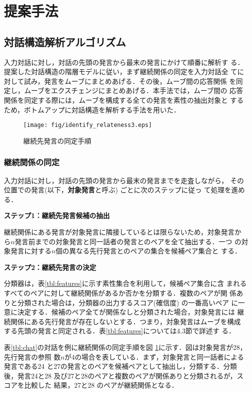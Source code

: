 \section{提案手法}

\subsection{対話構造解析アルゴリズム}
入力対話に対し，対話の先頭の発言から最末の発言にかけて順番に解析す
る．提案した対話構造の階層モデルに従い，まず継続関係の同定を入力対話全
てに対して試み，発言をムーブにまとめあげる．その後，ムーブ間の応答関係
を同定し，ムーブをエクスチェンジにまとめあげる．本手法では，ムーブ間の
応答関係を同定する際には，ムーブを構成する全ての発言を素性の抽出対象と
するため，ボトムアップに対話構造を解析する手法を用いた．

\begin{figure}[tbt]
 \centerline{
    \texttt{[image: fig/identify\_relateness3.eps]}
  }  
  \caption{継続先発言の同定手順}
  \label{fig:identify_relateness3}
\end{figure}

\subsubsection{継続関係の同定}
入力対話に対し，対話の先頭の発言から最末の発言までを走査しながら，
その位置での発言(以下，{\bf 対象発言}と呼ぶ) ごとに次のステップに従っ
て処理を進める．

\begin{description}
\item{\bf ステップ1：継続先発言候補の抽出}

継続関係にある発言が対象発言に隣接しているとは限らないため，対象発言か
ら$n$発言前までの対象発言と同一話者の発言とのペアを全て抽出する．一つ
の対象発言に対する$n$個の異なる先行発言とのペアの集合を候補ペア集合と
する．

\item{\bf ステップ2：継続先発言の決定} 

分類器は，表\ref{tbl:features}に示す素性集合を利用して，候補ペア集合に含
まれるすべてのペアに対して継続関係があるか否かを分類する．複数のペアが関
係ありと分類された場合は，分類器の出力するスコア(確信度) の一番高いペア
に一意に決定する．候補のペア全てが関係なしと分類された場合，対象発言には
継続関係にある先行発言が存在しないとする．つまり，対象発言はムーブを構成
する先頭の発言と同定される．表\ref{tbl:features}については4.3節で詳述す
る．

\end{description}
表\ref{tbl:chat}の対話を例に継続関係の同定手順を図
\ref{fig:identify_relateness3}に示す．図は対象発言が28，先行発言の参照
数$n$が4の場合を表している．まず，対象発言と同一話者による発言である24 
と27の発言とのペアを候補ペアとして抽出し，分類する．分類後，発言24と28 
及び27と28のペアと複数のペアが関係ありと分類されるが，スコアを比較した
結果，27と28 のペアが継続関係となる．

